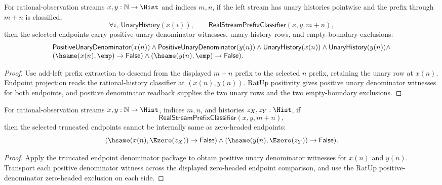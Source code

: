 \begin{theorem}
\label{thm:real-stream-prefix-add-left-endpoint-positive-unary-nonempty-package}
For rational-observation streams $x,y:\mathbb{N}\to\Hist$ and indices $m,n$, if
the left stream has unary histories pointwise and the prefix through $m+n$ is
classified,
$$
\forall i,\ \mathsf{UnaryHistory}(x(i)),
\qquad
\mathsf{RealStreamPrefixClassifier}(x,y,m+n),
$$
then the selected endpoints carry positive unary denominator witnesses, unary
history rows, and empty-boundary exclusions:
$$
\begin{array}{l}
\mathsf{PositiveUnaryDenominator}(x(n))\land
\mathsf{PositiveUnaryDenominator}(y(n))\land
\mathsf{UnaryHistory}(x(n))\land
\mathsf{UnaryHistory}(y(n))\land\\
(\hsame(x(n),\emp)\to\mathsf{False})\land
(\hsame(y(n),\emp)\to\mathsf{False}).
\end{array}
$$
\end{theorem}
\begin{proof}
Use add-left prefix extraction to descend from the displayed $m+n$ prefix to
the selected $n$ prefix, retaining the unary row at $x(n)$. Endpoint projection
reads the rational-history classifier at $(x(n),y(n))$. RatUp positivity gives
positive unary denominator witnesses for both endpoints, and positive
denominator readback supplies the two unary rows and the two empty-boundary
exclusions.
\end{proof}

\begin{theorem}
\label{thm:real-stream-prefix-truncated-endpoint-e0-absurd}
For rational-observation streams $x,y:\mathbb{N}\to\Hist$, indices $m,n$, and
histories $z_X,z_Y:\Hist$, if
$$
\mathsf{RealStreamPrefixClassifier}(x,y,m+n),
$$
then the selected truncated endpoints cannot be internally same as zero-headed
endpoints:
$$
(\hsame(x(n),\Ezero(z_X))\to\mathsf{False})
\land
(\hsame(y(n),\Ezero(z_Y))\to\mathsf{False}).
$$
\end{theorem}
\begin{proof}
Apply the truncated endpoint denominator package to obtain positive unary
denominator witnesses for $x(n)$ and $y(n)$. Transport each positive denominator
witness across the displayed zero-headed endpoint comparison, and use the
RatUp positive-denominator zero-headed exclusion on each side.
\end{proof}

